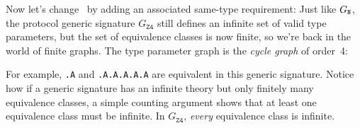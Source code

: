 \documentclass[../generics]{subfiles}
\begin{document}
\begin{example}\label{protocol z4 graph}  Now let's change \tN\ by adding an associated same-type requirement:
Just like $G_{\texttt{N}}$, the protocol generic signature $G_\texttt{Z4}$ still defines an infinite set of valid type parameters, but the set of equivalence classes is now finite, so we're back in the world of finite graphs. The type parameter graph is the \emph{cycle graph} of order~4:
\begin{center}
\end{center}
For example, \texttt{.A} and \texttt{.A.A.A.A.A} are equivalent in this generic signature. Notice how if a generic signature has an infinite theory but only finitely many equivalence classes, a simple counting argument shows that at least one equivalence class must be infinite. In $G_\texttt{Z4}$, \emph{every} equivalence class is infinite.
\end{example}
\end{document}
